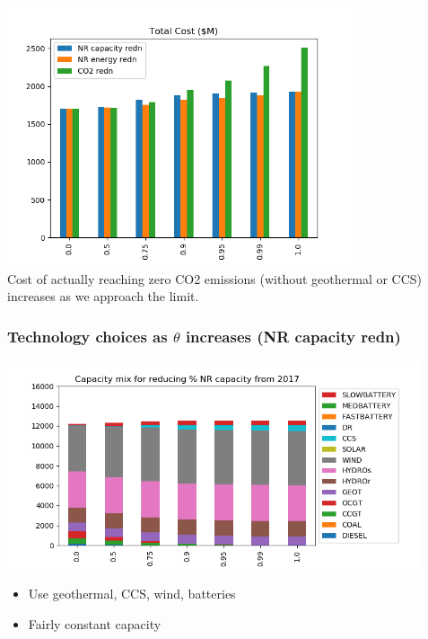 \documentclass[xcolor=dvipsnames]{beamer}
\begin{document}
\begin{frame}

  \centering
  \includegraphics[width=4.0in]{includes/TotalCostMv20.png} \\
  Cost of actually reaching zero CO2 emissions (without geothermal or CCS) increases as we approach the limit.
\end{frame}

\begin{frame}
  \frametitle{Technology choices as $\theta$ increases (NR capacity redn)}

  \includegraphics[width=4.8in]{includes/Scaprednv20.png} \\
  \begin{itemize}
  \item Use geothermal, CCS, wind, batteries
  \item Fairly constant capacity
  \end{itemize}
\end{frame}
\end{document}
